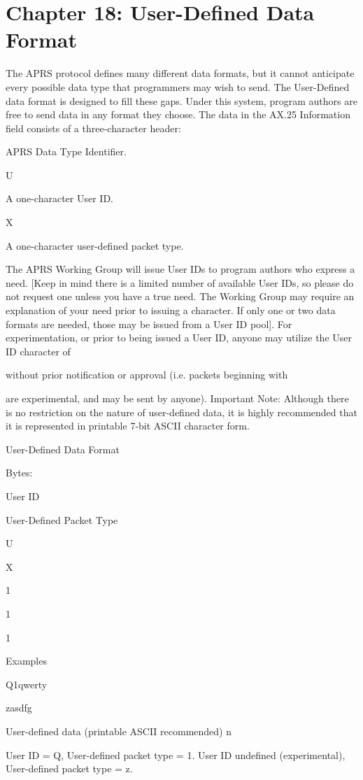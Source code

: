 \chapter{Chapter 18: User-Defined Data Format}


The APRS protocol defines many different data formats, but it cannot
anticipate every possible data type that programmers may wish to send. The
User-Defined data format is designed to fill these gaps. Under this system,
program authors are free to send data in any format they choose.
The data in the AX.25 Information field consists of a three-character header:
{

APRS Data Type Identifier.

U

A one-character User ID.

X

A one-character user-defined packet type.

The APRS Working Group will issue User IDs to program authors who
express a need.
[Keep in mind there is a limited number of available User IDs, so please do
not request one unless you have a true need. The Working Group may require
an explanation of your need prior to issuing a character. If only one or two
data formats are needed, those may be issued from a User ID pool].
For experimentation, or prior to being issued a User ID, anyone may utilize
the User ID character of { without prior notification or approval (i.e. packets
beginning with {{ are experimental, and may be sent by anyone).
Important Note: Although there is no restriction on the nature of user-defined data, it is highly recommended that it is represented in printable 7-bit
ASCII character form.

User-Defined Data Format

Bytes:

User
ID

User-Defined
Packet Type

{

U

X

1

1

1

Examples
{Q1qwerty
{{zasdfg

User-defined data (printable ASCII recommended)
n

User ID = Q, User-defined packet type = 1.
User ID undefined (experimental), User-defined packet type = z.

}}}}}}}}

